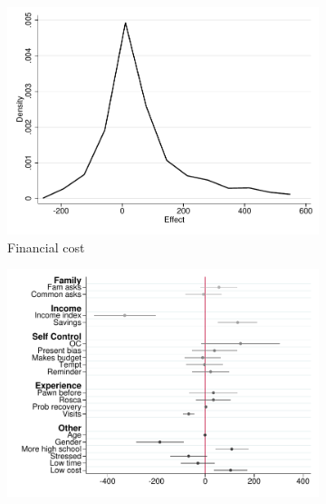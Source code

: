 \documentclass[11pt]{article}
\begin{document}
\begin{figure}[H]
    \caption{Heterogeneous Treatment Effect - NoChoice/Promise}
    \label{heterogeneous_te_3}
    \begin{center}
    \begin{subfigure}{0.4\textwidth}
        \caption{Financial cost}
        \centering
        \includegraphics[width=\textwidth]{Figuras/he_dist_fc_admin_disc_pro_3.pdf}
    \end{subfigure}
    \begin{subfigure}{0.4\textwidth}
        \caption*{}
        \centering
        \includegraphics[width=\textwidth]{Figuras/HE/he_int_vertical_fc_admin_disc_pro_3.pdf}
    \end{subfigure}
    

\end{center}
\end{figure}
\end{document}
